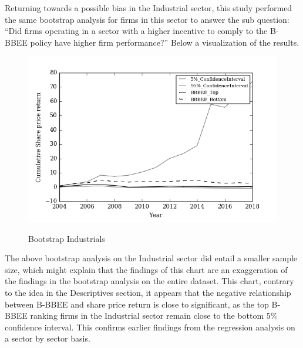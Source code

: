 Returning towards a possible bias in the Industrial sector, this study performed the same bootstrap analysis for firms in this sector to answer the sub question: “Did firms operating in a sector with a higher incentive to comply to the B-BBEE policy have higher firm performance?” Below a visualization of the results. 
\begin{figure}[H]
  \centering
  \includegraphics [scale=1]{Images/Bootstrap_Industrials.png} \\
  {\small {\it \caption{Bootstrap Industrials \label{fig:moun} }}}
\end{figure}
The above bootstrap analysis on the Industrial sector did entail a smaller sample size, which might explain that the findings of this chart are an exaggeration of the findings in the bootstrap analysis on the entire dataset. This chart, contrary to the idea in the Descriptives section, it appears that the negative relationship between B-BBEE and share price return is close to significant, as the top B-BBEE ranking firms in the Industrial sector remain close to the bottom 5\% confidence interval. This confirms earlier findings from the regression analysis on a sector by sector basis. 

